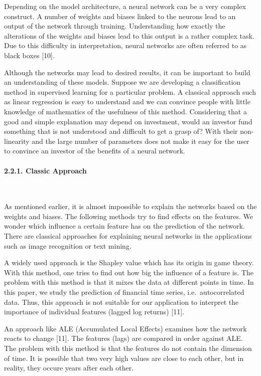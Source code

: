 \documentclass[
]{article}
\begin{document}
Depending on the model architecture, a neural network can be a very
complex construct. A number of weights and biases linked to the neurons
lead to an output of the network through training. Understanding how
exactly the alterations of the weights and biases lead to this output is
a rather complex task. Due to this difficulty in interpretation, neural
networks are often referred to as black boxes {[}10{]}.

Although the networks may lead to desired results, it can be important
to build an understanding of these models. Suppose we are developing a
classification method in supervised learning for a particular problem. A
classical approach such as linear regression is easy to understand and
we can convince people with little knowledge of mathematics of the
usefulness of this method. Considering that a good and simple
explanation may depend on investment, would an investor fund something
that is not understood and difficult to get a grasp of? With their
non-linearity and the large number of parameters does not make it easy
for the user to convince an investor of the benefits of a neural
network.

\hypertarget{classic}{%
\paragraph{2.2.1. Classic Approach}\label{classic}}

~

As mentioned earlier, it is almost impossible to explain the networks
based on the weights and biases. The following methods try to find
effects on the features. We wonder which influence a certain feature has
on the prediction of the network. There are classical approaches for
explaining neural networks in the applications such as image recognition
or text mining.

A widely used approach is the Shapley value which has its origin in game
theory. With this method, one tries to find out how big the influence of
a feature is. The problem with this method is that it mixes the data at
different points in time. In this paper, we study the prediction of
financial time series, i.e.~autocorrelated data. Thus, this approach is
not suitable for our application to interpret the importance of
individual features (lagged log returns) {[}11{]}.

An approach like ALE (Accumulated Local Effects) examines how the
network reacts to change {[}11{]}. The features (lags) are compared in
order against ALE. The problem with this method is that the features do
not contain the dimension of time. It is possible that two very high
values are close to each other, but in reality, they occure years after
each other.
\end{document}
